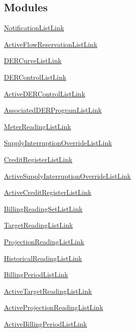 \subsection*{Modules}
\begin{DoxyCompactItemize}
\item 
\hyperlink{group__NotificationListLink}{Notification\+List\+Link}
\item 
\hyperlink{group__ActiveFlowReservationListLink}{Active\+Flow\+Reservation\+List\+Link}
\item 
\hyperlink{group__DERCurveListLink}{D\+E\+R\+Curve\+List\+Link}
\item 
\hyperlink{group__DERControlListLink}{D\+E\+R\+Control\+List\+Link}
\item 
\hyperlink{group__ActiveDERControlListLink}{Active\+D\+E\+R\+Control\+List\+Link}
\item 
\hyperlink{group__AssociatedDERProgramListLink}{Associated\+D\+E\+R\+Program\+List\+Link}
\item 
\hyperlink{group__MeterReadingListLink}{Meter\+Reading\+List\+Link}
\item 
\hyperlink{group__SupplyInterruptionOverrideListLink}{Supply\+Interruption\+Override\+List\+Link}
\item 
\hyperlink{group__CreditRegisterListLink}{Credit\+Register\+List\+Link}
\item 
\hyperlink{group__ActiveSupplyInterruptionOverrideListLink}{Active\+Supply\+Interruption\+Override\+List\+Link}
\item 
\hyperlink{group__ActiveCreditRegisterListLink}{Active\+Credit\+Register\+List\+Link}
\item 
\hyperlink{group__BillingReadingSetListLink}{Billing\+Reading\+Set\+List\+Link}
\item 
\hyperlink{group__TargetReadingListLink}{Target\+Reading\+List\+Link}
\item 
\hyperlink{group__ProjectionReadingListLink}{Projection\+Reading\+List\+Link}
\item 
\hyperlink{group__HistoricalReadingListLink}{Historical\+Reading\+List\+Link}
\item 
\hyperlink{group__BillingPeriodListLink}{Billing\+Period\+List\+Link}
\item 
\hyperlink{group__ActiveTargetReadingListLink}{Active\+Target\+Reading\+List\+Link}
\item 
\hyperlink{group__ActiveProjectionReadingListLink}{Active\+Projection\+Reading\+List\+Link}
\item 
\hyperlink{group__ActiveBillingPeriodListLink}{Active\+Billing\+Period\+List\+Link}

\end{DoxyCompactItemize}
